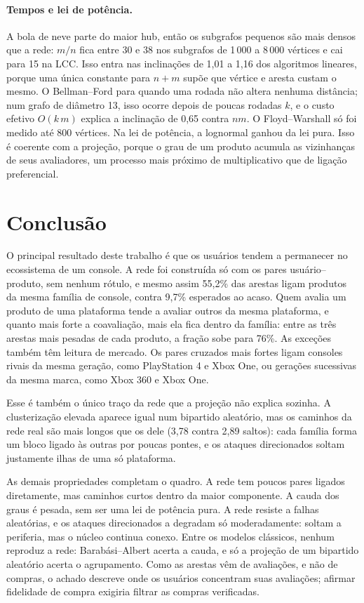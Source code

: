 \documentclass[sigconf,nonacm]{webmedia}
\begin{document}
\paragraph{Tempos e lei de potência.}
A bola de neve parte do maior hub, então os subgrafos pequenos são
mais densos que a rede: \(m/n\) fica entre 30 e 38 nos subgrafos de
1\,000 a 8\,000 vértices e cai para 15 na LCC. Isso entra nas
inclinações de 1,01 a 1,16 dos algoritmos lineares, porque uma única
constante para \(n+m\) supõe que vértice e aresta custam o mesmo. O
Bellman--Ford para quando uma rodada não altera nenhuma distância;
num grafo de diâmetro 13, isso ocorre depois de poucas rodadas
\(k\), e o custo efetivo \(O(k\,m)\) explica a inclinação de 0,65
contra \(nm\). O
Floyd--Warshall só foi medido até 800 vértices. Na lei de potência, a
lognormal ganhou da lei pura. Isso é coerente com a projeção, porque o
grau de um produto acumula as vizinhanças de seus avaliadores, um
processo mais próximo de multiplicativo que de ligação preferencial.

\section{Conclusão}

O principal resultado deste trabalho é que os usuários tendem a
permanecer no ecossistema de um console. A rede foi construída só com
os pares usuário--produto, sem nenhum rótulo, e mesmo assim 55,2\% das
arestas ligam produtos da mesma família de console, contra 9,7\%
esperados ao acaso. Quem avalia um produto de uma plataforma tende a
avaliar outros da mesma plataforma, e quanto mais forte a coavaliação,
mais ela fica dentro da família: entre as três arestas mais pesadas de
cada produto, a fração sobe para 76\%. As exceções também têm leitura
de mercado. Os pares cruzados mais fortes ligam consoles rivais da
mesma geração, como PlayStation 4 e Xbox One, ou gerações sucessivas
da mesma marca, como Xbox 360 e Xbox One.

Esse é também o único traço da rede que a projeção não explica
sozinha. A clusterização elevada aparece igual num bipartido
aleatório, mas os caminhos da rede real são mais longos que os dele
(3,78 contra 2,89 saltos): cada família forma um bloco ligado às
outras por poucas pontes, e os ataques direcionados soltam justamente
ilhas de uma só plataforma.

As demais propriedades completam o quadro. A rede tem poucos pares
ligados diretamente, mas caminhos curtos dentro da maior componente.
A cauda dos graus é pesada, sem ser uma lei de potência pura. A rede
resiste a falhas aleatórias, e os ataques direcionados a degradam só
moderadamente: soltam a periferia, mas o núcleo continua conexo. Entre
os modelos clássicos, nenhum reproduz a rede: Barabási--Albert acerta
a cauda, e só a projeção de um bipartido aleatório acerta o
agrupamento. Como as arestas vêm de avaliações, e não de compras, o
achado descreve onde os usuários concentram suas avaliações; afirmar
fidelidade de compra exigiria filtrar as compras verificadas.
\end{document}
